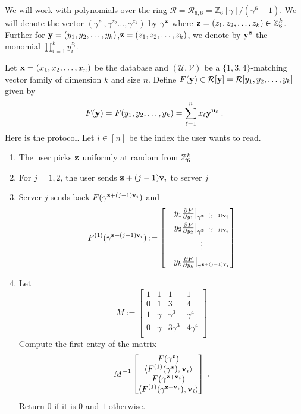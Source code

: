 We will work with polynomials over the ring $\mathcal{R}=\mathcal{R}_{6,6}=\mathbb{Z}_6[\gamma]/(\gamma^6-1)$. We will denote the vector $(\gamma^{z_1},\gamma^{z_2}\ldots,\gamma^{z_k})$ by $\gamma^{\mathbf{z}}$ where $\mathbf{z}=(z_1,z_2,\ldots,z_k)\in \mathbb{Z}_6^k$. Further for $\mathbf{y}=(y_1,y_2,\ldots,y_k)$,$\mathbf{z}=(z_1,z_2,\ldots,z_k)$, we denote by $\mathbf{y}^{\mathbf{z}}$ the monomial $\prod_{i=1}^ky_i^{z_i}$.

Let $\mathbf{x}=(x_1,x_2,\ldots,x_n)$ be the database and $(\mathcal{U},\mathcal{V})$ be a $\{1,3,4\}$-matching vector family of dimension $k$ and size $n$. 
Define $F(\mathbf{y})\in \mathcal{R}[\mathbf{y}]=\mathcal{R}[y_1,y_2,\ldots,y_k]$ given by 
\[
F(\mathbf{y})=F(y_1,y_2,\ldots,y_k)=\sum_{\ell=1}^nx_\ell\mathbf{y}^{\mathbf{u}_\ell}\;.
\]
Here is the protocol. Let $i\in [n]$ be the index the user wants to read.
\begin{enumerate}
    \item The user picks $\mathbf{z}$ uniformly at random from $\mathbb{Z}_6^k$
    \item For $j=1,2$, the user sends $\mathbf{z}+(j-1)\mathbf{v}_i$ to server $j$
    \item Server $j$ sends back $F(\gamma^{\mathbf{z}+(j-1)\mathbf{v}_i})$ and 
    \begin{displaymath}
        F^{(1)}(\gamma^{\mathbf{z}+(j-1)\mathbf{v}_i}):=\left[
        \begin{matrix}
            & y_1\frac{\partial F}{\partial y_1}\big|_{\gamma^{\mathbf{z}+(j-1)\mathbf{v}_i}}\\[0.5em] 
            &y_2\frac{\partial F}{\partial y_2}\big|_{\gamma^{\mathbf{z}+(j-1)\mathbf{v}_i}}\\[0.5em] 
            &\vdots\\[0.5em] 
            &y_k\frac{\partial F}{\partial y_k}\big|_{\gamma^{\mathbf{z}+(j-1)\mathbf{v}_i}}
        \end{matrix}
        \right]
    \end{displaymath}
    \item Let
    \[
    M:=\left[
    \begin{matrix}
        1 &1 &1 &1 \\
        0 &1 &3 &4 \\
        1 &\gamma &\gamma^3 &\gamma^4\\
        0 &\gamma &3\gamma^3 &4\gamma^4\\
    \end{matrix}\right]
    \]
    Compute the first entry of the matrix
    \[M^{-1} \left[
    \begin{matrix}
        F(\gamma^{\mathbf{z}})\\
        \langle F^{(1)}(\gamma^{\mathbf{z}}), \mathbf{v}_i\rangle\\
        F(\gamma^{\mathbf{z}+\mathbf{v}_i})\\
        \langle F^{(1)}(\gamma^{\mathbf{z}+\mathbf{v}_i}), \mathbf{v}_i\rangle\\
    \end{matrix}
    \right]\;.\]
    Return $0$ if it is $0$ and $1$ otherwise.
\end{enumerate}
